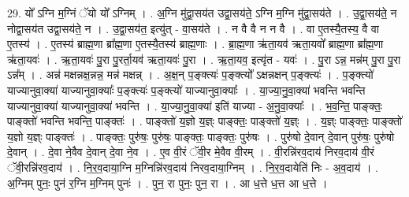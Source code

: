 \documentclass[17pt]{extarticle}
\begin{document}
29. यो᳚ ऽग्नि म॒ग्निं ॅयो यो᳚ ऽग्निम् । . अ॒ग्नि मु॑द्वा॒सय॑त उद्वा॒सय॑ते॒ ऽग्नि म॒ग्नि मु॑द्वा॒सय॑ते । . उ॒द्वा॒सय॑ते॒ न नोद्वा॒सय॑त उद्वा॒सय॑ते॒ न । . उ॒द्वा॒सय॑त॒ इत्यु॑त् - वा॒सय॑ते । . न वै वै न न वै । . वा ए॒तस्यै॒तस्य॒ वै वा ए॒तस्य॑ । . ए॒तस्य॑ ब्राह्म॒णा ब्रा᳚ह्म॒णा ए॒तस्यै॒तस्य॑ ब्राह्म॒णाः । . ब्रा॒ह्म॒णा ऋ॑ता॒यव॑ ऋता॒यवो᳚ ब्राह्म॒णा ब्रा᳚ह्म॒णा ऋ॑ता॒यवः॑ । . ऋ॒ता॒यवः॑ पु॒रा पु॒रर्ता॒यव॑ ऋता॒यवः॑ पु॒रा । . ऋ॒ता॒यव॒ इत्यृ॑त - यवः॑ । . पु॒रा ऽन्न॒ मन्न॑म् पु॒रा पु॒रा ऽन्न᳚म् । . अन्न॑ मक्षन्नक्ष॒न्नन्न॒ मन्न॑ मक्षन्न् । . अ॒क्ष॒न् प॒ङ्क्त्यः॑ प॒ङ्क्त्यो᳚ ऽक्षन्नक्षन् प॒ङ्क्त्यः॑ । . प॒ङ्क्त्यो॑ याज्यानुवा॒क्या॑ याज्यानुवा॒क्याः᳚ प॒ङ्क्त्यः॑ प॒ङ्क्त्यो॑ याज्यानुवा॒क्याः᳚ । . या॒ज्या॒नु॒वा॒क्या॑ भवन्ति भवन्ति याज्यानुवा॒क्या॑ याज्यानुवा॒क्या॑ भवन्ति । . या॒ज्या॒नु॒वा॒क्या॑ इति॑ याज्या - अ॒नु॒वा॒क्याः᳚ । . भ॒व॒न्ति॒ पाङ्क्तः॒ पाङ्क्तो॑ भवन्ति भवन्ति॒ पाङ्क्तः॑ । . पाङ्क्तो॑ य॒ज्ञो य॒ज्ञ्ः पाङ्क्तः॒ पाङ्क्तो॑ य॒ज्ञ्ः । . य॒ज्ञ्ः पाङ्क्तः॒ पाङ्क्तो॑ य॒ज्ञो य॒ज्ञ्ः पाङ्क्तः॑ । . पाङ्क्तः॒ पुरु॑षः॒ पुरु॑षः॒ पाङ्क्तः॒ पाङ्क्तः॒ पुरु॑षः । . पुरु॑षो दे॒वान् दे॒वान् पुरु॑षः॒ पुरु॑षो दे॒वान् । . दे॒वा ने॒वैव दे॒वान् दे॒वा ने॒व । . ए॒व वी॒रं ॅवी॒र मे॒वैव वी॒रम् । . वी॒रन्नि॑रव॒दाय॑ निरव॒दाय॑ वी॒रं ॅवी॒रन्नि॑रव॒दाय॑ । . नि॒र॒व॒दाया॒ग्नि म॒ग्निन्नि॑रव॒दाय॑ निरव॒दाया॒ग्निम् । . नि॒र॒व॒दायेति॑ निः - अ॒व॒दाय॑ । . अ॒ग्निम् पुनः॒ पुन॑ र॒ग्नि म॒ग्निम् पुनः॑ । . पुन॒ रा पुनः॒ पुन॒ रा । . आ ध॒त्ते ध॒त्त आ ध॒त्ते । \newline
\end{document}

